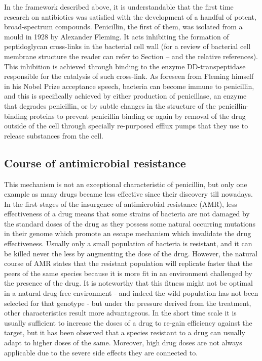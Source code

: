 \documentclass[a4paper,11pt]{extreport}
\begin{document}
In the framework described above, it is understandable that the first time research on antibiotics was satisfied with the development of a handful of potent, broad-spectrum compounds.
%
Penicillin, the first of them, was isolated from a mould in 1928 by Alexander Fleming. It acts inhibiting the formation of peptidoglycan cross-links in the bacterial cell wall (for a review of bacterial cell membrane structure the reader can refer to Section -- and the relative references). This inhibition is achieved through binding to the enzyme DD-transpeptidase responsible for the catalysis of such cross-link.\cite{McKellar1999???}
%
As foreseen from Fleming himself in his Nobel Prize acceptance speech, bacteria can become immune to penicillin, and this is specifically achieved by either production of penicillase, an enzyme that degrades penicillin, or by subtle changes in the structure of the penicillin-binding proteins to prevent penicillin binding or again by removal of the drug outside of the cell through specially re-purposed efflux pumps that they use to release substances from the cell.

\subsection{Course of antimicrobial resistance} \label{sec:course_AMR}
This mechanism is not an exceptional characteristic of penicillin, but only one example as many drugs became less effective since their discovery till nowadays. In the first stages of the insurgence of antimicrobial resistance (AMR), less effectiveness of a drug means that some strains of bacteria are not damaged by the standard doses of the drug as they possess some natural occurring mutations in their genome which promote an escape mechanism which invalidate the drug effectiveness.\cite{Kapoor2017,Blair2014} Usually only a small population of bacteria is resistant, and it can be killed never the less by augmenting the dose of the drug. However, the natural course of AMR states that the resistant population will replicate faster that the peers of the same species because it is more fit in an environment challenged by the presence of the drug. It is noteworthy that this fitness might not be optimal in a natural drug-free environment - and indeed the wild population has not been selected for that genotype - but under the pressure derived from the treatment, other characteristics result more advantageous.
%
In the short time scale it is usually sufficient to increase the doses of a drug to re-gain efficiency against the target, but it has been observed that a species resistant to a drug can usually adapt to higher doses of the same.\cite{????} Moreover, high drug doses are not always applicable due to the severe side effects they are connected to.\cite{????}
\end{document}
